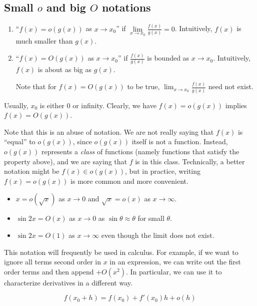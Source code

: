 \documentclass[a4paper]{article}
\begin{document}
\subsection{Small \texorpdfstring{$o$}{o} and big \texorpdfstring{$O$}{O} notations}
\begin{defi}\leavevmode
  \begin{enumerate}
    \item ``$f(x) = o(g(x))$ as $x\to x_0$'' if $\lim\limits_{x\to x_0} \frac{f(x)}{g(x)} = 0$. Intuitively, $f(x)$ is much smaller than $g(x)$.
    \item ``$f(x) = O(g(x))$ as $x\to x_0$'' if $\frac{f(x)}{g(x)}$ is bounded as $x\to x_0$. Intuitively, $f(x)$ is about as big as $g(x)$.

      Note that for $f(x) = O(g(x))$ to be true, $\displaystyle \lim_{x\to x_0} \frac{f(x)}{g(x)}$ need not exist.
  \end{enumerate}
  Usually, $x_0$ is either $0$ or infinity. Clearly, we have $f(x)=o(g(x))$ implies $f(x) = O(g(x))$.
\end{defi}
Note that this is an abuse of notation. We are not really saying that $f(x)$ is ``equal'' to $o(g(x))$, since $o(g(x))$ itself is not a function. Instead, $o(g(x))$ represents a \emph{class} of functions (namely functions that satisfy the property above), and we are saying that $f$ is in this class. Technically, a better notation might be $f(x) \in o(g(x))$, but in practice, writing $f(x) = o(g(x))$ is more common and more convenient.

\begin{eg}\leavevmode
  \begin{itemize}
    \item $x=o(\sqrt{x})$ as $x\to 0$ and $\sqrt{x} = o(x)$ as $x\to \infty$.
    \item $\sin 2x = O(x)$ as $x\to 0$ as $\sin \theta \approx \theta$ for small $\theta$.
    \item $\sin 2x = O(1)$ as $x\to \infty$ even though the limit does not exist.
  \end{itemize}
\end{eg}

This notation will frequently be used in calculus. For example, if we want to ignore all terms second order in $x$ in an expression, we can write out the first order terms and then append $+O(x^2)$. In particular, we can use it to characterize derivatives in a different way.
\begin{prop}
  \[
    f(x_0 + h) = f(x_0) + f'(x_0)h + o(h)
  \]
\end{prop}
\end{document}
